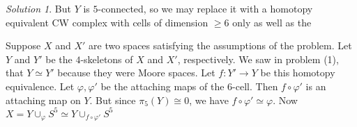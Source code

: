 \documentclass[reqno]{amsart}
\theoremstyle{definition}
\theoremstyle{remark}
\newtheorem*{solution}{Solution}
\begin{document}
\begin{solution}
But $Y$ is $5$-connected, so we may replace it with
a homotopy equivalent CW complex with cells of
dimension $\ge 6$ only as well as the

Suppose $X$ and $X'$ are two spaces
satisfying the assumptions of the problem.
Let $Y$ and $Y'$ be the $4$-skeletons of $X$ and $X'$, respectively.
We saw in problem (1), that $Y \simeq Y'$ because they were
Moore spaces. Let
$f \colon Y' \to Y$ be this homotopy equivalence.
Let $\varphi , \varphi '$ be the attaching maps of the
$6$-cell.
Then $f  \circ \varphi '$ is an attaching
map on $Y$. But since
$\pi_5 \left( Y \right) \cong 0$, we have
$f \circ \varphi ' \simeq \varphi $.
Now
$X = Y \cup_{\varphi } S^{5} 
\simeq Y \cup_{f \circ \varphi '} S^{5}$



    \end{solution}











\end{document}
